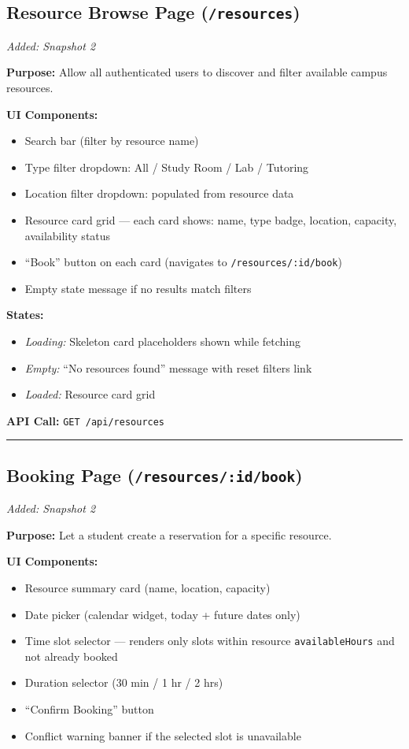 \documentclass[12pt]{article}
\begin{document}
\subsection{Resource Browse Page (\texttt{/resources})}
\textit{Added: Snapshot 2}

\textbf{Purpose:} Allow all authenticated users to discover and filter available campus resources.

\textbf{UI Components:}
\begin{itemize}
    \item Search bar (filter by resource name)
    \item Type filter dropdown: All / Study Room / Lab / Tutoring
    \item Location filter dropdown: populated from resource data
    \item Resource card grid --- each card shows: name, type badge, location, capacity, availability status
    \item ``Book'' button on each card (navigates to \texttt{/resources/:id/book})
    \item Empty state message if no results match filters
\end{itemize}

\textbf{States:}
\begin{itemize}
    \item \textit{Loading:} Skeleton card placeholders shown while fetching
    \item \textit{Empty:} ``No resources found'' message with reset filters link
    \item \textit{Loaded:} Resource card grid
\end{itemize}

\textbf{API Call:} \texttt{GET /api/resources}

\hrule\vspace{1em}

\subsection{Booking Page (\texttt{/resources/:id/book})}
\textit{Added: Snapshot 2}

\textbf{Purpose:} Let a student create a reservation for a specific resource.

\textbf{UI Components:}
\begin{itemize}
    \item Resource summary card (name, location, capacity)
    \item Date picker (calendar widget, today + future dates only)
    \item Time slot selector --- renders only slots within resource \texttt{availableHours} and not already booked
    \item Duration selector (30 min / 1 hr / 2 hrs)
    \item ``Confirm Booking'' button
    \item Conflict warning banner if the selected slot is unavailable
\end{itemize}
\end{document}
